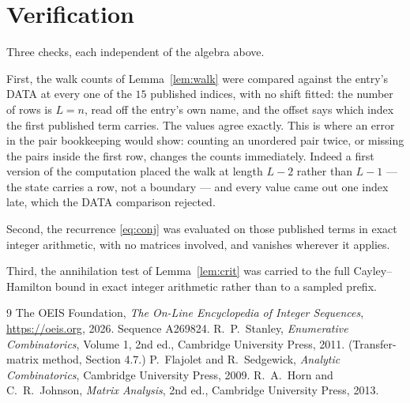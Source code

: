 \documentclass[11pt,a4paper]{article}
\theoremstyle{plain}
\theoremstyle{definition}
\begin{document}
\section{Verification}

Three checks, each independent of the algebra above.

First, the walk counts of Lemma~\ref{lem:walk} were compared against the entry's DATA at
every one of the $15$ published indices, with no shift fitted: the number of rows is
$L=n$, read off the entry's own name, and the offset says which index the first
published term carries. The values agree exactly. This is where an error in the pair
bookkeeping would show: counting an unordered pair twice, or missing the pairs inside the
first row, changes the counts immediately. Indeed a first version of the computation
placed the walk at length $L-2$ rather than $L-1$ --- the state carries a row, not a
boundary --- and every value came out one index late, which the DATA comparison rejected.

Second, the recurrence \eqref{eq:conj} was evaluated on those published terms in exact
integer arithmetic, with no matrices involved, and vanishes wherever it applies.

Third, the annihilation test of Lemma~\ref{lem:crit} was carried to the full
Cayley--Hamilton bound in exact integer arithmetic rather than to a sampled prefix.

\begin{thebibliography}{9}
 The OEIS Foundation, \emph{The On-Line Encyclopedia of Integer
Sequences}, \url{https://oeis.org}, 2026. Sequence A269824.
 R.~P.~Stanley, \emph{Enumerative Combinatorics}, Volume 1, 2nd ed.,
Cambridge University Press, 2011. (Transfer-matrix method, Section 4.7.)
 P.~Flajolet and R.~Sedgewick, \emph{Analytic Combinatorics}, Cambridge
University Press, 2009.
 R.~A.~Horn and C.~R.~Johnson, \emph{Matrix Analysis}, 2nd ed., Cambridge
University Press, 2013.
\end{thebibliography}
\end{document}
